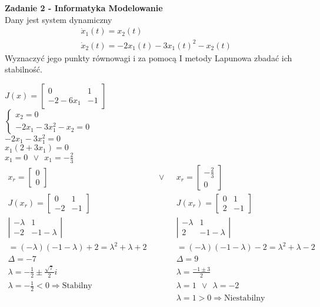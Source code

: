 \documentclass[a4paper,11pt]{article}
\begin{document}
\newpage
\begin{framed}
\textbf{Zadanie 2 - Informatyka Modelowanie } \\ 
Dany jest system dynamiczny 
\begin{align*}
&\dot{x}_{1}(t)=x_{2}(t) \\
&\dot{x}_{2}(t)=-2x_{1}(t)-3x_{1}(t)^{2}-x_{2}(t)
\end{align*}
Wyznaczyć jego punkty równowagi i za pomocą I metody Lapunowa zbadać ich stabilność.
\end{framed}


$J(x)=\left[ \begin{array}{cc}  0&1\\-2-6x_1 & -1   \end{array}\right]$\\
$\begin{cases}x_2=0\\-2x_1-3x_1^2-x_2=0\end{cases}$\\
$-2x_1-3x_1^2=0$\\
$x_1(2+3x_1)=0$\\
$x_1=0\ \  \vee \ \ x_1=-\frac23$\\
$\begin{array}{lll}
x_r= \left[ \begin{array}{c}   0\\0    \end{array}\right] &\ \ \ \vee \ \ \ & x_r= \left[ \begin{array}{c}   -\frac 23\\0    \end{array}\right] \\
J(x_r)=\left[ \begin{array}{cc}  0&1\\-2&-1    \end{array}\right] && J(x_r)=\left[ \begin{array}{cc}   0&1\\2&-1    \end{array}\right]\\
\left| \begin{array}{cc}  -\lambda & 1 \\-2&-1-\lambda    \end{array}\right|&&\left| \begin{array}{cc}  -\lambda & 1 \\2&-1-\lambda    \end{array}\right|\\
=(-\lambda)(-1-\lambda)+2=\lambda^2+\lambda+2&&=(-\lambda)(-1-\lambda)-2=\lambda^2+\lambda-2\\
\Delta=-7&&\Delta=9\\
\lambda=-\frac 12 \pm \frac{\sqrt 7}{2}i&&\lambda=\frac{-1 \pm 3}{2}\\
\lambda = -\frac 12 <0 \Rightarrow \text{Stabilny} && \lambda = 1 \ \ \vee \ \ \lambda=-2\\
 && \lambda = 1 >0 \Rightarrow \text{Niestabilny}
\end{array}$\\
\end{document}
